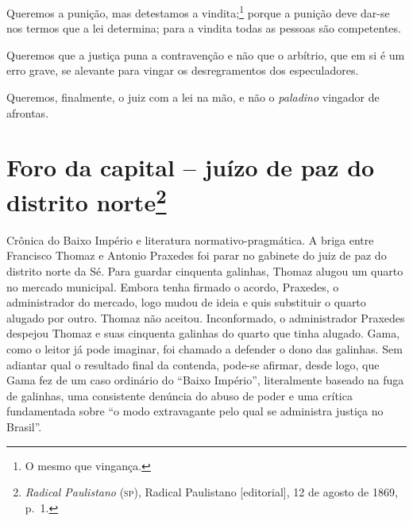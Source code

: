 Queremos a punição, mas detestamos a vindita;\footnote{O mesmo que
  vingança.} porque a punição deve dar-se nos termos que a lei
determina; para a vindita todas as pessoas são competentes.

Queremos que a justiça puna a contravenção e não que o arbítrio, que em
si é um erro grave, se alevante para vingar os desregramentos dos
especuladores.

Queremos, finalmente, o juiz com a lei na mão, e não o \emph{paladino}
vingador de afrontas.

\chapter{Foro da capital -- juízo de paz do distrito norte\footnote{\emph{Radical Paulistano} (\textsc{sp}), Radical Paulistano {[}editorial{]},
  12 de agosto de 1869, p.~1.}}

\begin{didascalia}
Crônica do Baixo Império e literatura normativo-pragmática. A briga
entre Francisco Thomaz e Antonio Praxedes foi parar no gabinete do juiz
de paz do distrito norte da Sé. Para guardar cinquenta galinhas, Thomaz
alugou um quarto no mercado municipal. Embora tenha firmado o acordo,
Praxedes, o administrador do mercado, logo mudou de ideia e quis
substituir o quarto alugado por outro. Thomaz não aceitou. Inconformado,
o administrador Praxedes despejou Thomaz e suas cinquenta galinhas do
quarto que tinha alugado. Gama, como o leitor já pode imaginar, foi
chamado a defender o dono das galinhas. Sem adiantar qual o resultado
final da contenda, pode-se afirmar, desde logo, que Gama fez de um caso
ordinário do ``Baixo Império'', literalmente baseado na fuga de galinhas,
uma consistente denúncia do abuso de poder e uma crítica fundamentada
sobre ``o modo extravagante pelo qual se administra justiça no Brasil''.
\end{didascalia}


